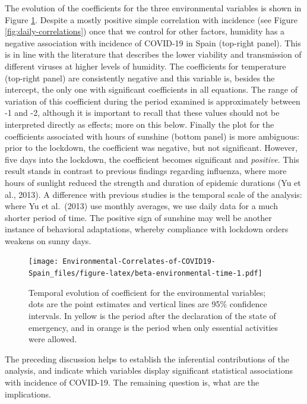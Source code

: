 \documentclass[]{elsarticle} %
\begin{document}
The evolution of the coefficients for the three environmental variables
is shown in Figure \ref{fig:beta-environmental-time}. Despite a mostly
positive simple correlation with incidence (see Figure
\ref{fig:daily-correlations}) once that we control for other factors,
humidity has a negative association with incidence of COVID-19 in Spain
(top-right panel). This is in line with the literature that describes
the lower viability and transmission of different viruses at higher
levels of humidity. The coefficients for temperature (top-right panel)
are consistently negative and this variable is, besides the intercept,
the only one with significant coefficients in all equations. The range
of variation of this coefficient during the period examined is
approximately between -1 and -2, although it is important to recall that
these values should not be interpreted directly as effects; more on this
below. Finally the plot for the coefficients associated with hours of
sunshine (bottom panel) is more ambiguous: prior to the lockdown, the
coefficient was negative, but not significant. However, five days into
the lockdown, the coefficient becomes significant and \emph{positive}.
This result stands in contrast to previous findings regarding influenza,
where more hours of sunlight reduced the strength and duration of
epidemic durations (Yu et al., 2013). A difference with previous studies
is the temporal scale of the analysis: where Yu et al.~(2013) use
monthly averages, we use daily data for a much shorter period of time.
The positive sign of sunshine may well be another instance of behavioral
adaptations, whereby compliance with lockdown orders weakens on sunny
days.

\begin{figure}
\centering
\texttt{[image: Environmental-Correlates-of-COVID19-Spain\_files/figure-latex/beta-environmental-time-1.pdf]}
\caption{\label{fig:beta-environmental-time}Temporal evolution of
coefficient for the environmental variables; dots are the point
estimates and vertical lines are 95\% confidence intervals. In yellow is
the period after the declaration of the state of emergency, and in
orange is the period when only essential activities were allowed.}
\end{figure}

The preceding discussion helps to establish the inferential
contributions of the analysis, and indicate which variables display
significant statistical associations with incidence of COVID-19. The
remaining question is, what are the implications.
\end{document}
